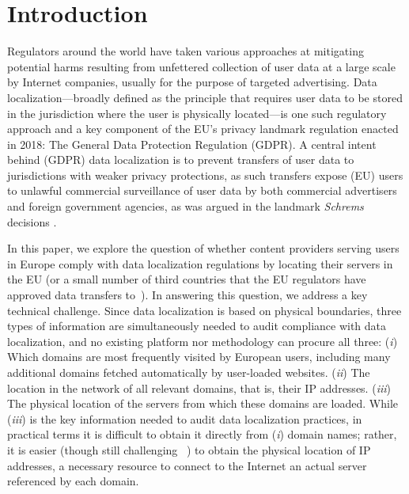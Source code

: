 \section{Introduction}

Regulators around the world have taken various approaches at mitigating potential harms
resulting from unfettered collection of user data at a large scale by Internet companies, 
usually for the purpose of targeted
advertising. Data localization---broadly defined as the principle that 
requires user data to be stored in the jurisdiction where the user is physically located---is 
one such 
regulatory approach and a key component of the EU's privacy landmark regulation enacted in 2018: 
The General Data Protection Regulation (GDPR). 
A central intent behind (GDPR) data localization is to prevent transfers of user 
data to jurisdictions with weaker privacy protections, as such transfers expose 
(EU) users to unlawful commercial surveillance of user data by both commercial 
advertisers and foreign government agencies, 
as was argued in the landmark \textit{Schrems} decisions \cite{schremsi,schremsii}.  


In this paper, we explore the question of whether content providers serving users in Europe 
comply with data localization regulations by locating their servers in the 
EU (or a small number of third countries that the EU regulators have approved 
data transfers to~\cite{Adequacy38:online}). In answering this question, we address a key technical 
challenge. Since data localization is based on physical boundaries, three types 
of information are simultaneously needed to audit compliance with data localization, 
and no existing platform nor methodology can procure all three: 
(\textit{i}) Which domains are most frequently visited by European users, including many additional 
domains fetched automatically 
by user-loaded websites. (\textit{ii}) The location in the network of all relevant 
domains, that is, their IP addresses. (\textit{iii}) The physical location of the servers from 
which these domains are loaded. While (\textit{iii}) is the key information needed to audit 
data localization practices, in practical terms it is difficult to obtain it directly from (\textit{i}) 
domain names; 
rather, it is easier (though still challenging ~\cite{10.1145/3402413.3402415}) to obtain the physical location of IP addresses, 
a necessary resource to connect to the Internet an actual server referenced by each domain.

